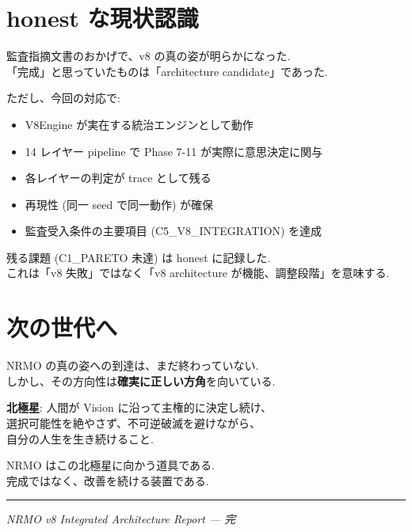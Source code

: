 \documentclass[a4paper,11pt]{report}
\begin{document}
\section{honest な現状認識}

監査指摘文書のおかげで、v8 の真の姿が明らかになった.\\
「完成」と思っていたものは「architecture candidate」であった.

ただし、今回の対応で:

\begin{itemize}[leftmargin=*]
  \item V8Engine が実在する統治エンジンとして動作
  \item 14 レイヤー pipeline で Phase 7-11 が実際に意思決定に関与
  \item 各レイヤーの判定が trace として残る
  \item 再現性 (同一 seed で同一動作) が確保
  \item 監査受入条件の主要項目 (C5\_V8\_INTEGRATION) を達成
\end{itemize}

残る課題 (C1\_PARETO 未達) は honest に記録した.\\
これは「v8 失敗」ではなく「v8 architecture が機能、調整段階」を意味する.

\section{次の世代へ}

NRMO の真の姿への到達は、まだ終わっていない.\\
しかし、その方向性は\textbf{確実に正しい方角}を向いている.

\begin{tcolorbox}[colback=navy!5, colframe=navy, width=\linewidth]
\centering
\textbf{北極星}: 人間が Vision に沿って主権的に決定し続け、\\
選択可能性を絶やさず、不可逆破滅を避けながら、\\
自分の人生を生き続けること.

\medskip

NRMO はこの北極星に向かう道具である.\\
完成ではなく、改善を続ける装置である.
\end{tcolorbox}

\vspace{1cm}

\rule{\linewidth}{0.5pt}

\centering
\emph{NRMO v8 Integrated Architecture Report — 完}
\end{document}
